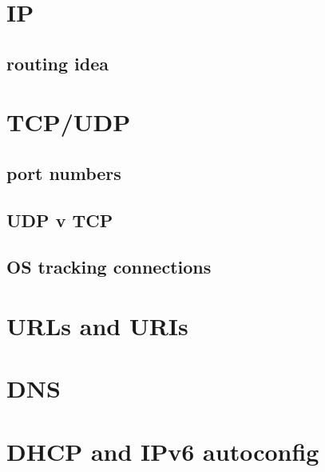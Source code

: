 

\section{IP}



\subsection{routing idea}



\section{TCP/UDP}

\subsection{port numbers}


\subsection{UDP v TCP}


\subsection{OS tracking connections}


\section{URLs and URIs}



\section{DNS}


\section{DHCP and IPv6 autoconfig}


